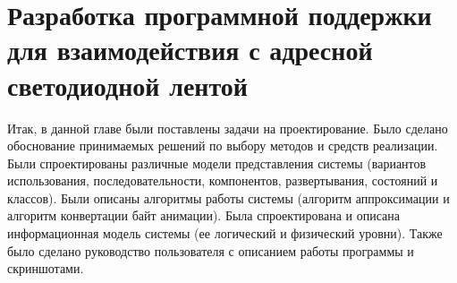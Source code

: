 \section{Разработка программной поддержки для взаимодействия с адресной светодиодной лентой}
\label{sec:develop}













Итак, в данной главе были поставлены задачи на проектирование. Было сделано обоснование принимаемых решений по выбору методов и средств реализации. Были спроектированы различные модели представления системы (вариантов использования, последовательности, компонентов, развертывания, состояний и классов). Были описаны алгоритмы работы системы (алгоритм аппроксимации и алгоритм конвертации байт анимации). Была спроектирована и описана информационная модель системы (ее логический и физический уровни). Также было сделано руководство пользователя с описанием работы программы и скриншотами.